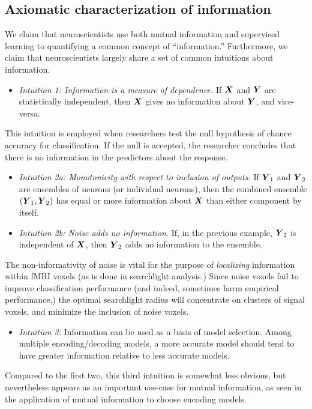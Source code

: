 \documentclass[12pt]{article}
\begin{document}
\subsection{Axiomatic characterization of information}\label{sec:axiom_info}

We claim that neuroscientists use both mutual information and
supervised learning to quantifying a common concept of
``information.''  Furthermore, we claim that neuroscientists largely
share a set of common intuitions about information.

\begin{itemize}
\item \emph{
Intuition 1: Information is a measure of dependence.}   If $\boldsymbol{X}$ and $\boldsymbol{Y}$ are statistically independent, then
$\boldsymbol{X}$ gives no information about $\boldsymbol{Y}$, and vice-versa.
\end{itemize}
This
intuition is employed when researchers test the null hypothesis of
chance accuracy for classification.  If the null is accepted, the
researcher concludes that there is no information in the predictors
about the response.

\begin{itemize}
\item \emph{
Intuition 2a: Monotonicity with respect to inclusion of outputs.} If $\boldsymbol{Y}_1$ and $\boldsymbol{Y}_2$ are ensembles of neurons (or
individual neurons), then the combined ensemble $(\boldsymbol{Y}_1, \boldsymbol{Y}_2)$ has equal or
more information about $\boldsymbol{X}$ than either component by itself.
\end{itemize}

\begin{itemize}
\item \emph{
Intuition 2b: Noise adds no information.} If, in the previous example, $\boldsymbol{Y}_2$ is independent of
$\boldsymbol{X}$, then $\boldsymbol{Y}_2$ adds no information to the ensemble.
\end{itemize}
The non-informativity of noise is vital for the purpose
of \emph{localizing} information within fMRI voxels (as is done in
searchlight analysis.)  Since noise voxels fail to improve
classification performance (and indeed, sometimes harm empirical
performance,) the optimal searchlight radius will concentrate on
clusters of signal voxels, and minimize the inclusion of noise voxels.

\begin{itemize}
\item \emph{Intuition 3:}
Information can be used as a basis of model selection.  Among multiple
encoding/decoding models, a more accurate model should tend to have
greater information relative to less accurate models.  
\end{itemize}
Compared to the first two, this third intuition is somewhat less
obvious, but nevertheless appears as an important use-case for mutual
information, as seen in the application of mutual information to
choose encoding models.
\end{document}
